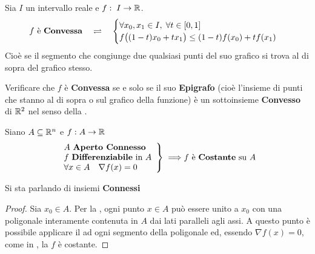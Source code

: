 \begin{definition}
	Sia $I$ un intervallo reale e $f:\; I \to \mathbb{R}$.
	\begin{equation*}
		f \text{ è \textbf{Convessa}}
		\quad \rightleftharpoons \quad
		\begin{cases}
			\forall x_0, x_1 \in I,\; \forall t \in \left[0,1\right]\\
			f \bigl( (1-t)x_0 + t x_1 \bigr) \leq (1-t) f(x_0) + t f(x_1)
		\end{cases}
	\end{equation*}
	Cioè se il segmento che congiunge due qualsiasi punti del suo grafico si trova al di sopra del grafico stesso.
\end{definition}
\begin{exercise}
	Verificare che $f$ è \textbf{Convessa} se e solo se il suo \textbf{Epigrafo} (cioè l'insieme di punti che stanno al di sopra o sul grafico della funzione)
	è un sottoinsieme \textbf{Convesso} di $\mathbb{R}^2$ nel senso della .
\end{exercise}
\begin{proposition}
	Siano $A \subseteq \mathbb{R}^n$ e $f: A \to \mathbb{R}$
	\[
		\left.
			\begin{array}{l}
				A \text{ \textbf{Aperto Connesso}}\\
				f \text{ \textbf{Differenziabile} in } A\\
				\forall x \in A \quad \nabla f(x) = 0
			\end{array}
		\right\}
		\implies\\
		f \text{ è \textbf{Costante} su } A
	\]
	\vspace*{-\baselineskip}
	\begin{note}
		Si sta parlando di insiemi \textbf{Connessi}
	\end{note}
	\begin{proof}
		Sia $x_0 \in A$. Per la , ogni punto $x \in A$ può essere unito a $x_0$ con una poligonale interamente contenuta in $A$ dai lati paralleli agli assi. A questo punto è possibile applicare il  ad ogni segmento della poligonale ed, essendo $\nabla f(x) = 0$, come in , la $f$ è costante.
	\end{proof}
\end{proposition}

\newpage
